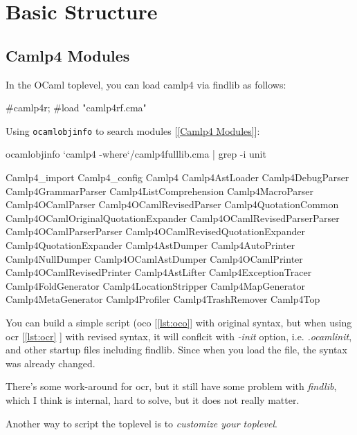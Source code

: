 \section{Basic Structure}


\subsection{Camlp4 Modules}
In the OCaml toplevel, you can load camlp4 via findlib as follows:

\begin{ocamlcode}
#camlp4r;
#load "camlp4rf.cma"
\end{ocamlcode}
Using \verb|ocamlobjinfo| to search modules [\ref{Camlp4 Modules}]:     


\begin{bashcode}
ocamlobjinfo `camlp4 -where`/camlp4fulllib.cma | grep -i unit
\end{bashcode}

\begin{bashcode}
 Camlp4_import Camlp4_config Camlp4 Camlp4AstLoader Camlp4DebugParser
 Camlp4GrammarParser Camlp4ListComprehension Camlp4MacroParser
 Camlp4OCamlParser Camlp4OCamlRevisedParser Camlp4QuotationCommon
 Camlp4OCamlOriginalQuotationExpander Camlp4OCamlRevisedParserParser
 Camlp4OCamlParserParser Camlp4OCamlRevisedQuotationExpander
 Camlp4QuotationExpander Camlp4AstDumper Camlp4AutoPrinter
 Camlp4NullDumper Camlp4OCamlAstDumper Camlp4OCamlPrinter
 Camlp4OCamlRevisedPrinter Camlp4AstLifter Camlp4ExceptionTracer
 Camlp4FoldGenerator Camlp4LocationStripper Camlp4MapGenerator
 Camlp4MetaGenerator Camlp4Profiler Camlp4TrashRemover Camlp4Top
\end{bashcode}

You can build a simple script (oco [\ref{lst:oco}] with original
syntax, but when using ocr [\ref{lst:ocr} ] with revised syntax, it
will conflcit with \textit{-init} option, i.e. \textit{.ocamlinit},
and other startup files including findlib. Since when you load the
file, the syntax was already changed.

There's some work-around for ocr, but it still have some problem with
\textit{findlib}, which I think is internal, hard to solve, but it
does not really matter.


Another way to script the toplevel  is to \textit{customize your toplevel}.



